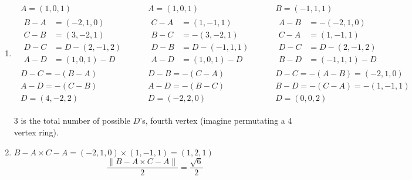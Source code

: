 \documentclass[twoside]{amsart}
\theoremstyle{plain}
\theoremstyle{definition}
\begin{document}
\begin{enumerate}
\item \[
\begin{gathered}
  \begin{gathered}
    A = (1,0,1) \\
    \begin{aligned}
      B-A & = (-2,1,0) \\
      C-B & = (3,-2,1) \\
      D-C & = D - (2,-1,2) \\ 
      A-D & = (1,0,1) - D 
\end{aligned} \\
    D- C = -(B-A) \\
    A-D = -(C-B)  \\
    \boxed{ D = (4,-2,2) }
\end{gathered} 
 \quad \quad 
 \begin{gathered}
   A = (1,0,1) \\
   \begin{aligned}
     C-A & = (1,-1,1) \\
     B-C & = -(3,-2,1) \\
     D-B & = D-(-1,1,1) \\
     A- D & = (1,0,1) - D  
   \end{aligned} \\
   D-B = -(C-A) \\
   A-D = -(B-C) \\
   \boxed{ D = (-2,2,0) } 
\end{gathered} 
\quad \quad 
\begin{gathered}
  B = (-1,1,1) \\
  \begin{aligned}
    A - B & = -(-2,1,0) \\
    C-A & = (1,-1,1) \\
    D-C & = D - (2,-1,2) \\
    B-D & = (-1,1,1) - D  
\end{aligned} \\
  D-C = -(A-B) = (-2,1,0) \\
  B-D = -(C-A) = -(1,-1,1) \\
  \boxed{ D = (0,0,2) }
\end{gathered}
\end{gathered}
\]

$3$ is the total number of possible $D$'s, fourth vertex (imagine permutating a 4 vertex ring).    
\item $B-A \times C-A = (-2,1,0) \times (1,-1,1) = (1,2,1)$
\[
\frac{ \| B-A \times C-A \| }{ 2 } = \boxed{ \frac{ \sqrt{6}}{2} }
\]
\end{enumerate}
\end{document}
